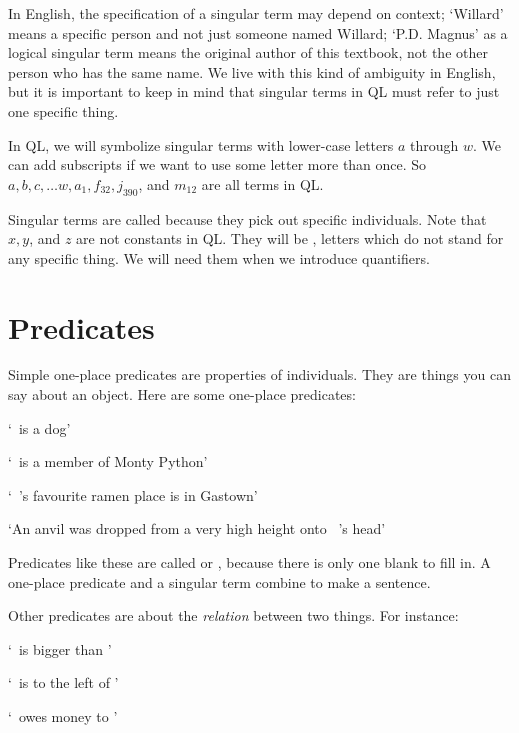 In English, the specification of a singular term may depend on context; `Willard' means a specific person and not just someone named Willard; `P.D. Magnus' as a logical singular term means the original author of this textbook, not the other person who has the same name. We live with this kind of ambiguity in English, but it is important to keep in mind that singular terms in QL must refer to just one specific thing.

In QL, we will symbolize singular terms with lower-case letters $a$ through $w$. We can add subscripts if we want to use some letter more than once. So $a,b,c,\ldots w, a_1, f_{32}, j_{390}$, and $m_{12}$ are all terms in QL.

Singular terms are called  because they pick out specific individuals. Note that $x, y$, and $z$ are not constants in QL. They will be , letters which do not stand for any specific thing. We will need them when we introduce quantifiers.

\section{Predicates}
Simple one-place predicates are properties of individuals. They are things you can say about an object. Here are some one-place predicates:

\begin{earg}
\item[] `\blank\ is a dog'
\item[] `\blank\ is a member of Monty Python'
\item[] `\blank\ 's favourite ramen place is in Gastown'
\item[] `An anvil was dropped from a very high height onto \blank\ 's head'
\end{earg}

Predicates like these are called  or , because there is only one blank to fill in. A one-place predicate and a singular term combine to make a sentence.

Other predicates are about the \emph{relation} between two things. For instance:

\begin{earg}
\item[] `\blank\ is bigger than \blank'
\item[] `\blank\ is to the left of \blank'
\item[] `\blank\ owes money to \blank'
\end{earg}

